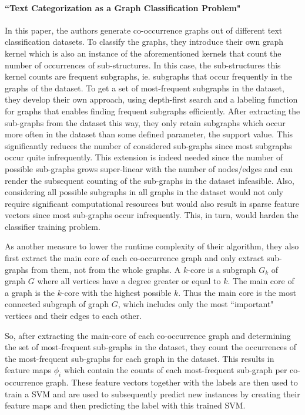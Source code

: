 \paragraph{``Text Categorization as a Graph Classification Problem" \cite{Rousseau2015a}}
In this paper, the authors generate co-occurrence graphs out of different text classification datasets.
To classify the graphs, they introduce their own graph kernel which is also an instance of the aforementioned kernels that count the number of occurrences of sub-structures.
In this case, the sub-structures this kernel counts are frequent subgraphs, ie. subgraphs that occur frequently in the graphs of the dataset.
To get a set of most-frequent subgraphs in the dataset, they develop their own approach, using depth-first search and a labeling function for graphs that enables finding frequent subgraphs efficiently.
After extracting the sub-graphs from the dataset this way, they only retain subgraphs which occur more often in the dataset than some defined parameter, the support value.
This significantly reduces the number of considered sub-graphs since most subgraphs occur quite infrequently.
This extension is indeed needed since the number of possible sub-graphs grows super-linear with the number of nodes/edges and can render the subsequent counting of the sub-graphs in the dataset infeasible.
Also, considering all possible subgraphs in all graphs in the dataset would not only require significant computational resources but would also result in sparse feature vectors since most sub-graphs occur infrequently.
This, in turn, would harden the classifier training problem.

As another measure to lower the runtime complexity of their algorithm, they also first extract the main core of each co-occurrence graph and only extract sub-graphs from them, not from the whole graphs.
A $k$-core is a subgraph $G_k$ of graph $G$ where all vertices have a degree greater or equal to $k$. The main core of a graph is the $k$-core with the highest possible $k$.
Thus the main core is the most connected subgraph of graph $G$, which includes only the most ``important" vertices and their edges to each other.

So, after extracting the main-core of each co-occurrence graph and determining the set of most-frequent sub-graphs in the dataset, they count the occurrences of the most-frequent sub-graphs for each graph in the dataset.
This results in feature maps $\phi_i$ which contain the counts of each most-frequent sub-graph per co-occurrence graph.
These feature vectors together with the labels are then used to train a SVM and are used to subsequently predict new instances by creating their feature maps and then predicting the label with this trained SVM.

